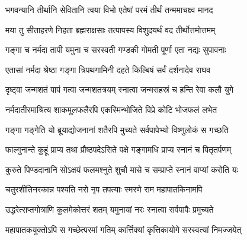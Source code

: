 

\vakta{}
\shrota{}
\tags{}

\storymeta

\resetShloka


\twolineshloka
{भगवन्यानि तीर्थानि सेवितानि त्वया विभो}
{एतेषां परमं तीर्थं तन्ममाचक्ष्व मानद}%

\twolineshloka
{मया तु सीताहरणे निहता ब्रह्मराक्षसाः}
{तत्पापस्य विशुदयर्थं वद तीर्थोत्तमोत्तमम्}%


\twolineshloka
{गङ्गा च नर्मदा तापी यमुना च सरस्वती}
{गण्डकी गोमती पूर्णा एता नद्यः सुपावनाः}%

\twolineshloka
{एतासां नर्मदा श्रेष्ठा गङ्गा त्रिपथगामिनी}
{दहते किल्बिषं सर्वं दर्शनादेव राघव}%

\twolineshloka
{दृष्ट्वा जन्मशतं पापं गत्वा जन्मशतत्रयम्}
{स्नात्वा जन्मसहस्रं च हन्ति रेवा कलौ युगे}%

\twolineshloka
{नर्मदातीरमाश्रित्य शाकमूलफलैरपि}
{एकस्मिन्भोजिते विप्रे कोटि भोजफलं लभेत}%

\twolineshloka
{गङ्गा गङ्गेति यो ब्रूयाद्योजनानां शतैरपि}
{मुच्यते सर्वपापेभ्यो विष्णुलोकं स गच्छति}%

\twolineshloka
{फाल्गुनान्ते कुहूं प्राप्य तथा प्रौष्ठपदेऽसिते}
{पक्षे गङ्गामधि प्राप्य स्नानं च पितृतर्पणम्}%

\twolineshloka
{कुरुते पिण्डदानानि सोऽक्षयं फलमश्नुते}
{शुचौ मासे च सम्प्राप्ते स्नानं वाप्यां करोति यः}%

\twolineshloka
{चतुरशीतिनरकान्न पश्यति नरो नृप}
{तपत्याः स्मरणे राम महापातकिनामपि}%

\twolineshloka
{उद्धरेत्सप्तगोत्राणि कुलमेकोत्तरं शतम्}
{यमुनायां नरः स्नात्वा सर्वपापैः प्रमुच्यते}%

\twolineshloka
{महापातकयुक्तोऽपि स गच्छेत्परमां गतिम्}
{कार्त्तिक्यां कृत्तिकायोगे सरस्वत्यां निमज्जयेत्}%

